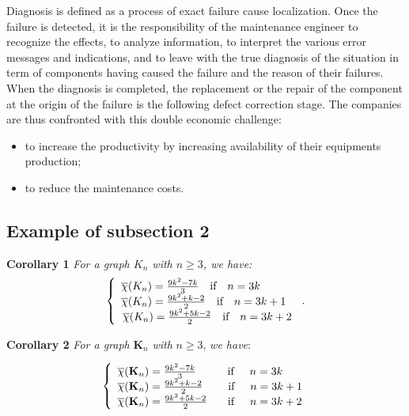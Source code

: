 \documentclass[11pt,a5paper,twoside]{article}
\begin{document}
Diagnosis is defined as a process of exact failure cause
localization. Once the failure is detected, it is the
responsibility of the maintenance engineer to recognize the
effects, to analyze information, to interpret the various error
messages and indications, and to leave with the true diagnosis of
the situation in term of components having caused the failure and
the reason of their failures. When the diagnosis is completed, the
replacement or the repair of the component at the origin of the
failure is the following defect correction stage. The companies
are thus confronted with this double economic challenge:
\begin{itemize}
	\item to increase the productivity by increasing availability of
	their equipments production;
	
	\item to reduce the maintenance costs.
\end{itemize}

\subsection{Example of subsection 2}\label{subsect2}

\textbf{Corollary 1} \textit{For a graph $K_n$ with $n\ge 3$, we have:}
\[
\left\{ {{\begin{array}{*{20}c}
		{\overline \chi (K_n )=\frac{9k^2-7k}{3}\quad \mbox{if}\quad n=3k} \quad\quad\quad\\
		{\overline \chi (K_n )=\frac{9k^2+k-2}{2}\quad \mbox{if}\quad n=3k+1} \ \  \\
		{\overline \chi (K_n )=\frac{9k^2+5k-2}{2}\quad \mbox{if}\quad n=3k+2} \\
		\end{array} }} \right. .
\]

\noindent \textbf{Corollary 2} \textit{For a graph}
\textbf{K}$_n$ \textit{with} $n\ge3$, \textit{we have}:

$$
\left\{
\begin{array}{l}
\overline{\chi}(\textbf{K}_n)=\frac{9k^2-7k}{3} \hspace{1.0cm} \text{if} \hspace{0.5cm} n=3k\\
\overline{\chi}(\textbf{K}_n)=\frac{9k^2+k-2}{2} \hspace{0.8cm} \text{if} \hspace{0.5cm} n=3k+1\\
\overline{\chi}(\textbf{K}_n)=\frac{9k^2+5k-2}{2} \hspace{0.65cm} \text{if} \hspace{0.5cm} n=3k+2\\
\end{array}
\right.
$$
\end{document}
